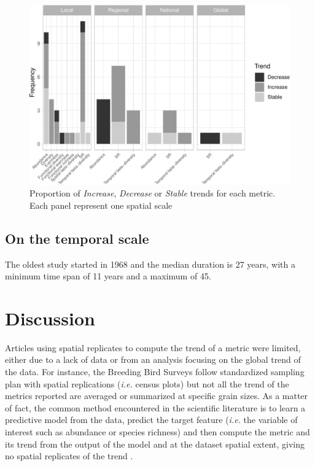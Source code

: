 \documentclass[
  12pt,
  oneside]{report}
\begin{document}
\begin{figure}
\centering
\includegraphics{literature_review_files/figure-latex/barmetricsperspatscale-1.pdf}
\caption{\label{fig:barmetricsperspatscale}Proportion of \emph{Increase}, \emph{Decrease} or \emph{Stable} trends for each metric. Each panel represent one spatial scale}
\end{figure}

\hypertarget{on-the-temporal-scale}{%
\section{On the temporal scale}\label{on-the-temporal-scale}}

The oldest study started in 1968 and the median duration is 27 years, with a minimum time span of 11 years and a maximum of 45.

\hypertarget{discussion}{%
\chapter{Discussion}\label{discussion}}

Articles using spatial replicates to compute the trend of a metric were limited, either due to a lack of data or from an analysis focusing on the global trend of the data. For instance, the Breeding Bird Surveys \autocites[\emph{e.g.}][]{sauer_north_2013,kamp_population_2021} follow standardized sampling plan with spatial replications (\emph{i.e.} census plots) but not all the trend of the metrics reported are averaged or summarized at specific grain sizes. As a matter of fact, the common method encountered in the scientific literature is to learn a predictive model from the data, predict the target feature (\emph{i.e.} the variable of interest such as abundance or species richness) and then compute the metric and its trend from the output of the model and at the dataset spatial extent, giving no spatial replicates of the trend \autocites[\emph{e.g.}][]{jiguet_modeling_2005,jiguet_french_2012,eglington_disentangling_2012,doxa_low-intensity_2010,sauer_first_2017}.
\end{document}
